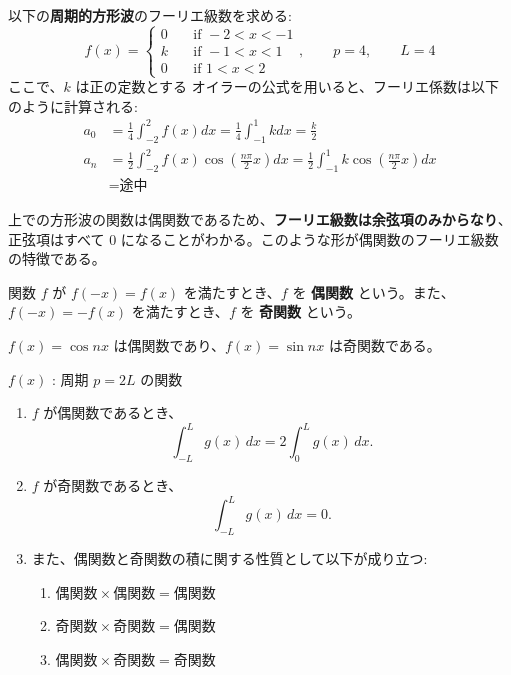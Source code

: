 \documentclass[article,paper=a4paper]{jlreq}
\begin{document}
\begin{ex}
    以下の\textbf{周期的方形波}のフーリエ級数を求める:
    \[f(x) = \begin{cases} 0 \quad & \text{if } -2 < x < -1 \\ k \quad & \text{if } -1 < x < 1\\ 0 \quad & \text{if } 1 < x < 2 \end{cases}, \qquad p=4 , \qquad L = 4\]
    ここで、$k$ は正の定数とする
    オイラーの公式を用いると、フーリエ係数は以下のように計算される:
\begin{align*}
    a_0 &= \frac{1}{4} \int_{-2}^{2} f(x) dx = \frac{1}{4} \int_{-1}^{1} k dx = \frac{k}{2} \\
    a_n &= \frac{1}{2} \int_{-2}^{2} f(x) \cos \left( \frac{n\pi}{2}x \right) dx 
        = \frac{1}{2} \int_{-1}^{1} k \cos \left( \frac{n\pi}{2}x \right) dx \\
        &= \text{途中}
\end{align*}
\end{ex}

上での方形波の関数は偶関数であるため、\textbf{フーリエ級数は余弦項のみからなり}、正弦項はすべて $0$ になることがわかる。このような形が偶関数のフーリエ級数の特徴である。

\begin{dfn}
    関数 $f$ が $f(-x) = f(x)$ を満たすとき、$f$ を \textbf{偶関数} という。また、$f(-x) = -f(x)$ を満たすとき、$f$ を \textbf{奇関数} という。
\end{dfn}

\begin{ex}
    $f(x) = \cos nx$ は偶関数であり、$f(x) = \sin nx$ は奇関数である。
\end{ex}

\begin{prop}
    \quad $f(x)$ : 周期 $p=2L$ の関数\par
    \begin{enumerate}[label=(\arabic*)\,]
        \item $f$ が偶関数であるとき、
        \[\int_{-L}^{L}g(x)\, dx = 2\int_{0}^{L}g(x)\, dx.\]
        \item $f$ が奇関数であるとき、
        \[\int_{-L}^{L}g(x)\, dx = 0.\]
        \item また、偶関数と奇関数の積に関する性質として以下が成り立つ:\begin{enumerate}[label=(\roman*)\,]
            \item $\text{偶関数} \times \text{偶関数} = \text{偶関数}$
            \item $\text{奇関数} \times \text{奇関数} = \text{偶関数}$
            \item $\text{偶関数} \times \text{奇関数} = \text{奇関数}$
        \end{enumerate}
    \end{enumerate}
\end{prop}
\end{document}
